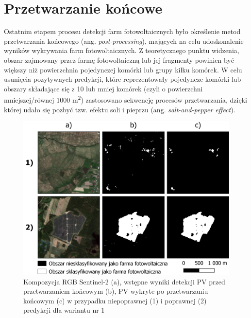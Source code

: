 \documentclass{amuthesis}
\begin{document}
\hypertarget{sec-post-processing}{%
\section{Przetwarzanie końcowe}\label{sec-post-processing}}

Ostatnim etapem procesu detekcji farm fotowoltaicznych było określenie
metod przetwarzania końcowego (ang. \emph{post-processing}), mających na
celu udoskonalenie wyników wykrywania farm fotowoltaicznych. Z
teoretycznego punktu widzenia, obszar zajmowany przez farmę
fotowoltaiczną lub jej fragmenty powinien być większy niż powierzchnia
pojedynczej komórki lub grupy kilku komórek. W celu usunięcia
pozytywnych predykcji, które reprezentowały pojedyncze komórki lub
obszary składające się z 10 lub mniej komórek (czyli o powierzchni
mniejszej/równej 1000 m\textsuperscript{2}) zastosowano sekwencję
procesów przetwarzania, dzięki której udało się pozbyć tzw. efektu soli
i pieprzu (ang. \emph{salt-and-pepper effect}).

\begin{figure}[t]

{\centering \includegraphics[width=1\textwidth,height=\textheight]{figures/postprocessing_pl.png}

}

\caption{\label{fig-rycina-post-processing}Kompozycja RGB Sentinel-2
(a), wstępne wyniki detekcji PV przed przetwarzaniem końcowym (b), PV
wykryte po przetwarzaniu końcowym (c) w przypadku niepoprawnej (1) i
poprawnej (2) predykcji dla wariantu nr 1}

\end{figure}
\end{document}
